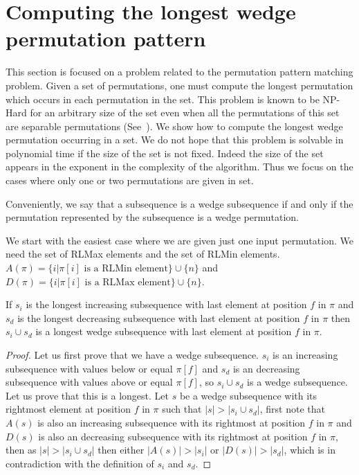 \documentclass[a4paper]{llncs}
\begin{document}

\section{Computing the longest wedge permutation pattern}
\label{section:LCS}

This section is focused on a problem related to the permutation pattern matching problem.
Given a set of permutations, one must compute the longest permutation
which occurs in each permutation in the set.
This problem is known to be NP-Hard for an arbitrary size of the set even
when all the permutations of this set are separable permutations (See~\cite{2007math......2109B}).
We show how to compute the longest wedge permutation
occurring in a set.
We do not hope that this problem is solvable in polynomial time
if the size of the set is not fixed.
Indeed the size of the set appears in the exponent
in the complexity of the algorithm.
Thus we focus on the cases where only one or two permutations are given in set.

Conveniently, we say that a subsequence is
a wedge subsequence if and only if the permutation represented by the subsequence
is a wedge permutation.

We start with the easiest case where we are given just one input permutation.
We need the set of RLMax elements and the set of RLMin elements.
$A(\pi) = \{i | \text{$\pi[i]$ is a RLMin element} \} \cup \{n\}$ and
$D(\pi) = \{i | \text{$\pi[i]$ is a RLMax element} \} \cup \{n\}$.\\


\begin{proposition}
\label{proposition:longestIncreasingSubsequence}
If $s_i$ is the longest increasing subsequence with last element at position $f$ in $\pi$
and $s_d$ is the longest decreasing subsequence with last element at position $f$ in $\pi$
then $s_i \cup s_d$ is a longest wedge subsequence with last element at position $f$ in $\pi$.
\end{proposition}

\begin{proof}
Let us first prove that we have a wedge subsequence.
$s_i$ is an increasing subsequence with values below or equal $\pi[f]$ and
$s_d$ is an decreasing subsequence with values above or equal $\pi[f]$,
so $s_i \cup s_d$ is a wedge subsequence.
Let us prove that this is a longest.
Let $s$ be a wedge subsequence with its rightmost element at position $f$ in $\pi$ such
that $|s|>|s_i \cup s_d|$,
first note that $A(s)$ is also an increasing subsequence with its rightmost  at position $f$ in $\pi$
and $D(s)$ is also an decreasing subsequence with its rightmost  at position $f$ in $\pi$,
then as $|s|>|s_i \cup s_d|$ then either $|A(s)| > |s_i|$ or $|D(s)| > |s_d|$,
which is in contradiction with the definition of $s_i$ and $s_d$.
\end{proof}
\end{document}
